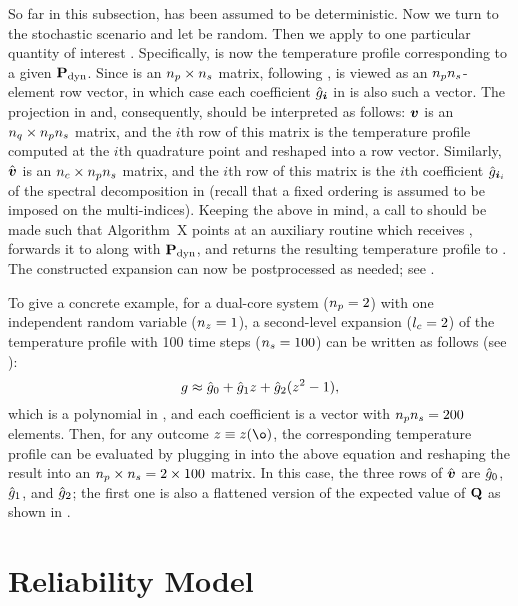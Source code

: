 So far in this subsection, \vu has been assumed to be deterministic. Now we turn
to the stochastic scenario and let \vu be random. Then we apply
 to one particular quantity of interest \g.
Specifically, \g is now the temperature profile \mq corresponding to a given
$\mathbf{P}_{\mathrm{dyn}}$. Since \mq is an ${n_{p}} \times {n_{s}}$ matrix, following
, \g is viewed as an ${n_{p}} {n_{s}}$-element row vector, in
which case each coefficient $\hat{g}_{\boldsymbol{i}}$ in
 is also such a vector. The projection in
 and, consequently, 
should be interpreted as follows: $\boldsymbol{v}$ is an ${n_{q}} \times {n_{p}} {n_{s}}$ matrix, and
the $i$th row of this matrix is the temperature profile computed at the $i$th
quadrature point and reshaped into a row vector. Similarly, $\hat{\boldsymbol{v}}$ is an
${n_{c}} \times {n_{p}} {n_{s}}$ matrix, and the $i$th row of this matrix is the $i$th
coefficient $\hat{g}_{\boldsymbol{i}_i}$ of the spectral decomposition in
 (recall that a fixed ordering is assumed to be
imposed on the multi-indices). Keeping the above in mind, a call to
 should be made such that Algorithm~X points at an
auxiliary routine which receives \vu, forwards it to 
along with $\mathbf{P}_{\mathrm{dyn}}$, and returns the resulting temperature profile to
. The constructed expansion can now be
postprocessed as needed; see .

To give a concrete example, for a dual-core system (${n_{p}} = 2$) with one
independent random variable (${n_{z}} = 1$), a second-level expansion (${l_{c}} = 2$) of
the temperature profile with 100 time steps (${n_{s}} = 100$) can be written as
follows (see ):
\[
  g \approx \hat{g}_0 + \hat{g}_1 z + \hat{g}_2(z^2 - 1),
\]
which is a polynomial in \z, and each coefficient is a vector with ${n_{p}} {n_{s}} =
200$ elements. Then, for any outcome $\z \equiv \z(\o)$, the corresponding
temperature profile \mq can be evaluated by plugging in \z into the above
equation and reshaping the result into an ${n_{p}} \times {n_{s}} = 2 \times 100$
matrix. In this case, the three rows of $\hat{\boldsymbol{v}}$ are $\hat{g}_0$,
$\hat{g}_1$, and $\hat{g}_2$; the first one is also a flattened version of the
expected value of $\mathbf{Q}$ as shown in .

\section{Reliability Model}

